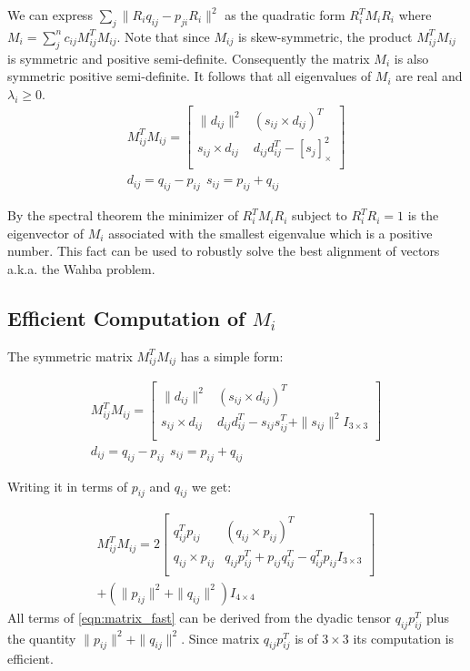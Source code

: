 \documentclass{birkjour}
\numberwithin{equation}{section}
\begin{document}
We can express $\sum_j \|R_i q_{ij} - p_{ji} R_i\|^2$ as the quadratic form $R_i^T M_i R_i$ where $M_i = \sum_j^n { c_{ij} M_{ij}^T M_{ij}}$. Note that since $M_{ij}$ is skew-symmetric, the product $M_{ij}^T M_{ij}$ is symmetric and positive semi-definite.
Consequently the matrix $M_i$ is also symmetric positive semi-definite. It follows that all eigenvalues of $M_i$ are real and $\lambda_i \geq 0$.
\begin{eqnarray}
	M_{ij}^T M_{ij} = 
	\left[\begin{array}{cc}
		\| d_{ij} \|^2       &         (s_{ij} \times d_{ij})^T \\
		s_{ij} \times d_{ij}  &    d_{ij} d_{ij}^T - \left[ s_j \right]^2_\times \\
	\end{array}\right]\\
	d_{ij} = q_{ij} - p_{ij} \ \ s_{ij} = p_{ij} + q_{ij}  \nonumber
\end{eqnarray}

By the spectral theorem the minimizer of $R_i^T M_i R_i$ subject to $R_i^T R_i = 1$ is the eigenvector of $M_i$ associated with the smallest eigenvalue which is a positive number. This fact can be used to robustly solve the best alignment of vectors a.k.a. the Wahba problem.


 \subsection{Efficient Computation of $M_i$}

The symmetric matrix $M_{ij}^T M_{ij}$ has a simple form:

\begin{eqnarray*}
	M_{ij}^T M_{ij} = 
	\left[\begin{array}{cc}
		\| d_{ij} \|^2        &         (s_{ij} \times d_{ij})^T \\
		s_{ij} \times d_{ij}  &    d_{ij} d_{ij}^T - s_{ij} s_{ij}^T + \| s_{ij} \|^2 I_{3\times3} \\
	\end{array}\right]\\
     d_{ij} = q_{ij} - p_{ij} \ \ s_{ij} = p_{ij} + q_{ij}  \nonumber
\end{eqnarray*}

Writing it in terms of $p_{ij}$ and $q_{ij}$ we get:

\begin{eqnarray}
   \label{eqn:matrix_fast}
   	M_{ij}^T M_{ij} 
   	= 2
	\left[\begin{array}{cc}
		q_{ij}^T p_{ij}       &         (q_{ij} \times p_{ij})^T \\
		q_{ij} \times p_{ij}  &    q_{ij} p_{ij}^T + p_{ij} q_{ij}^T - q_{ij}^T p_{ij} I_{3\times3} \\
	\end{array}\right]\\ \nonumber
    + (\| p_{ij} \|^2 + \| q_{ij} \|^2) I_{4\times4}
\end{eqnarray}
All terms of \ref{eqn:matrix_fast} can be derived from the dyadic tensor $q_{ij} p_{ij}^T$ plus the quantity $\|p_{ij} \|^2 + \| q_{ij} \|^2$. Since matrix $q_{ij} p_{ij}^T$ is of $3\times3$ its computation is efficient. 
\end{document}
